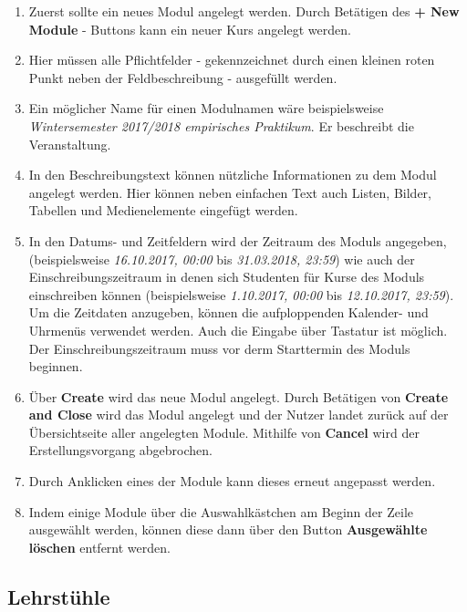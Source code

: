     \begin{enumerate}
    \item Zuerst sollte ein neues Modul angelegt werden. Durch Betätigen des \textbf{+ New Module} - Buttons kann ein neuer Kurs angelegt werden.
    \item Hier müssen alle Pflichtfelder - gekennzeichnet durch einen kleinen roten Punkt neben der Feldbeschreibung - ausgefüllt werden.
    \item Ein möglicher Name für einen Modulnamen wäre beispielsweise \textit{Wintersemester 2017/2018 empirisches Praktikum}. Er beschreibt die Veranstaltung.
    \item In den Beschreibungstext können nützliche Informationen zu dem Modul angelegt werden.
	  Hier können neben einfachen Text auch Listen, Bilder, Tabellen und Medienelemente eingefügt werden.
    \item In den Datums- und Zeitfeldern wird der Zeitraum des Moduls angegeben, (beispielsweise \textit{16.10.2017, 00:00} bis \textit{31.03.2018, 23:59}) 
	  wie auch der Einschreibungszeitraum in denen sich Studenten für Kurse des Moduls einschreiben können (beispielsweise \textit{1.10.2017, 00:00} bis \textit{12.10.2017, 23:59}).
	  Um die Zeitdaten anzugeben, können die aufploppenden Kalender- und Uhrmenüs verwendet werden. Auch die Eingabe über Tastatur ist möglich.
	  Der Einschreibungszeitraum muss vor derm Starttermin des Moduls beginnen.
    \item Über \textbf{Create} wird das neue Modul angelegt. 
	  Durch Betätigen von \textbf{Create and Close} wird das Modul angelegt und der Nutzer landet zurück auf der Übersichtseite aller angelegten Module.
	  Mithilfe von \textbf{Cancel} wird der Erstellungsvorgang abgebrochen.
    \item Durch Anklicken eines der Module kann dieses erneut angepasst werden.
    \item Indem einige Module über die Auswahlkästchen am Beginn der Zeile ausgewählt werden, können diese dann über den Button \textbf{Ausgewählte löschen} entfernt werden.
    \end{enumerate}
    
    \subsection{Lehrstühle}
    
